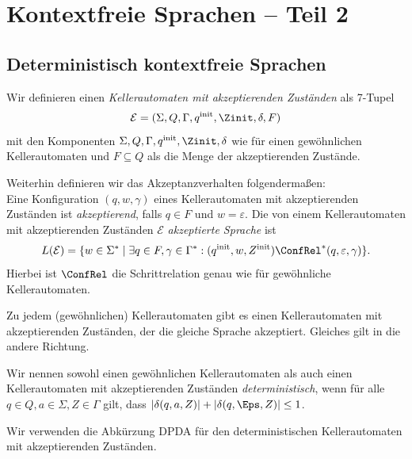 \section{Kontextfreie Sprachen -- Teil 2}


\subsection{Deterministisch kontextfreie Sprachen}

\begin{Def}
Wir definieren einen \emph{Kellerautomaten mit akzeptierenden Zuständen} als 7-Tupel
\[
	\mathcal{E} = (\Sigma,Q,\Gamma,q^\text{init},\Zinit,\delta,F)
\]
mit den Komponenten $\Sigma,Q,\Gamma,q^\text{init},\Zinit,\delta$ wie für einen gewöhnlichen Kellerautomaten und $F \subseteq Q$ als die Menge der akzeptierenden Zustände.

\smallskip

Weiterhin definieren wir das Akzeptanzverhalten folgendermaßen: \\
Eine Konfiguration $(q, w, \gamma)$ eines Kellerautomaten mit akzeptierenden Zuständen ist \emph{akzeptierend}, falls $q \in F$ und $w = \varepsilon$.
Die von einem Kellerautomaten mit akzeptierenden Zuständen $\mathcal{E}$ \emph{akzeptierte Sprache} ist
\[
	L(\mathcal{E}) = \{w \in \Sigma^* \mid \exists q \in F, \gamma \in \Gamma^*: (q^\text{init}, w, Z^\text{init}) \ConfRel^* (q, \varepsilon, \gamma)\}.
\]
Hierbei ist $\ConfRel$ die Schrittrelation genau wie für gewöhnliche Kellerautomaten.
\end{Def}

\begin{lemma}
Zu jedem (gewöhnlichen) Kellerautomaten gibt es einen Kellerautomaten mit akzeptierenden Zuständen, der die gleiche Sprache akzeptiert.
Gleiches gilt in die andere Richtung.
\end{lemma}




\begin{Def}[name={[DPDA]}]
Wir nennen sowohl einen gewöhnlichen Kellerautomaten als auch einen Kellerautomaten mit akzeptierenden Zuständen \emph{deterministisch},
wenn für alle $q\in Q,a\in\Sigma,Z\in\Gamma$ gilt, dass $|\delta(q,a,Z)| + |\delta(q,\Eps,Z)| \leq 1$.

Wir verwenden die Abkürzung \ac{DPDA} für den deterministischen Kellerautomaten mit akzeptierenden Zuständen.
\end{Def}

